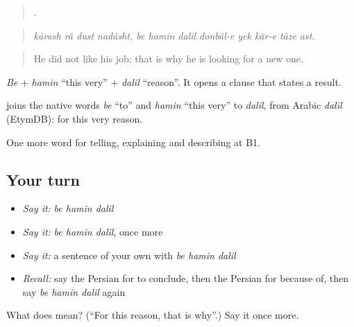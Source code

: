 \begin{quote}
           .
\end{quote}

\begin{quote}
\emph{kârash râ dust nadâsht, be hamin dalil donbâl-e yek kâr-e tâze ast.}
\end{quote}

\begin{quote}
He did not like his job; that is why he is looking for a new one.
\end{quote}

\emph{Be} + \emph{hamin} \textquotedblleft{}this very\textquotedblright{} + \emph{dalil} \textquotedblleft{}reason\textquotedblright{}. It opens a clause that states a result.

\begin{cousinweb}
\textbf{  } joins the native words \emph{be} \textquotedblleft{}to\textquotedblright{} and \emph{hamin} \textquotedblleft{}this very\textquotedblright{} to \emph{dalil}, from Arabic \emph{dalīl} (EtymDB): for this very reason.
\end{cousinweb}

\begin{grammarlens}[title={What you've built}]
One more word for telling, explaining and describing at B1.
\end{grammarlens}

\subsection*{Your turn}
\begin{itemize}
\raggedright
  \item \emph{Say it:} \emph{be hamin dalil}
  \item \emph{Say it:} \emph{be hamin dalil}, once more
  \item \emph{Say it:} a sentence of your own with \emph{be hamin dalil}
  \item \emph{Recall:} say the Persian for to conclude, then the Persian for because of, then say \emph{be hamin dalil} again
\end{itemize}

\begin{tcolorbox}[breakable,colback=teal!4,colframe=teal!35!black,title={Before you move on}]
What does    mean? (\textquotedblleft{}For this reason, that is why\textquotedblright{}.) Say it once more.
\end{tcolorbox}
